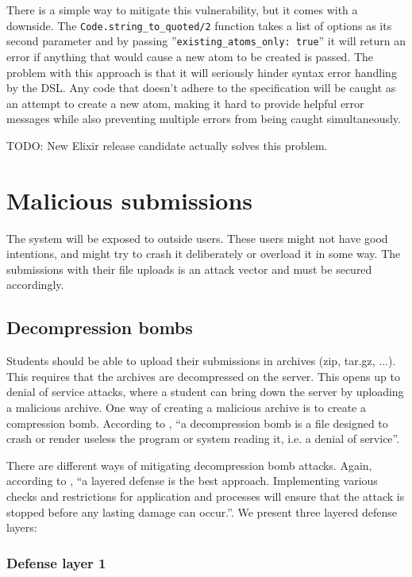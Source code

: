 There is a simple way to mitigate this vulnerability, but it comes with a downside. The \texttt{Code.string_to_quoted/2} function takes a list of options as its second parameter and by passing ''\texttt{existing_atoms_only: true}'' it will return an error if anything that would cause a new atom to be created is passed. The problem with this approach is that it will seriously hinder syntax error handling by the DSL. Any code that doesn't adhere to the specification will be caught as an attempt to create a new atom, making it hard to provide helpful error messages while also preventing multiple errors from being caught simultaneously.

TODO: New Elixir release candidate actually solves this problem.

\section{Malicious submissions}

The system will be exposed to outside users. These users might not have good intentions, and might try to crash it deliberately or overload it in some way. The submissions with their file uploads is an attack vector and must be secured accordingly.

\subsection{Decompression bombs}
\label{decompression_bombs}

Students should be able to upload their submissions in archives (zip, tar.gz, ...). This requires that the archives are decompressed on the server. This opens up to denial of service attacks, where a student can bring down the server by uploading a malicious archive. One way of creating a malicious archive is to create a compression bomb. According to \citet{Cara2019Bomb.codes}, ``a decompression bomb is a file designed to crash or render useless the program or system reading it, i.e. a denial of service''.

There are different ways of mitigating decompression bomb attacks. Again, according to \citet{Cara2019Bomb.codes}, ``a layered defense is the best approach. Implementing various checks and restrictions for application and processes will ensure that the attack is stopped before any lasting damage can occur.''. We present three layered defense layers:

\subsubsection*{Defense layer 1}

